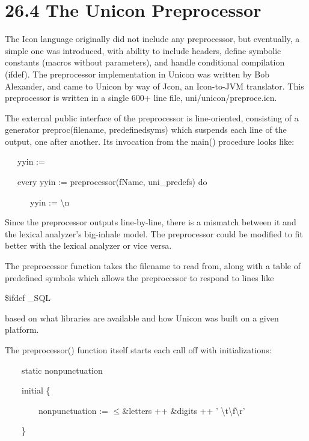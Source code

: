 \section[26.4 The Unicon Preprocessor]{26.4 The Unicon Preprocessor}

The Icon language originally did not include any preprocessor, but
eventually, a simple one was introduced, with ability to include
headers, define symbolic constants (macros without parameters), and
handle conditional compilation (ifdef).  The preprocessor
implementation in Unicon was written by Bob Alexander, and came to
Unicon by way of Jcon, an Icon-to-JVM translator. This preprocessor is
written in a single 600+ line file, uni/unicon/preproce.icn.

The external public interface of the preprocessor is line-oriented,
consisting of a generator preproc(filename, predefinedsyms) which
suspends each line of the output, one after another. Its invocation
from the main() procedure looks like:

{\ttfamily\mdseries
\ \ \ yyin := {\textquotedbl}{\textquotedbl}}

{\ttfamily\mdseries
\ \ \ every yyin {\textbar}{\textbar}:= preprocessor(fName, uni\_predefs) do}

{\ttfamily\mdseries
\ \ \ \ \ \ yyin {\textbar}{\textbar}:= {\textquotedbl}{\textbackslash}n{\textquotedbl}}


Since the preprocessor outputs line-by-line, there is a mismatch
between it and the lexical analyzer's big-inhale model.  The
preprocessor could be modified to fit better with the lexical analyzer
or vice versa.

The preprocessor function takes the filename to read from, along with
a table of predefined symbols which allows the preprocessor to respond
to lines like

{\ttfamily\mdseries
\$ifdef \_SQL}

\noindent based on what libraries are available and how Unicon was
built on a given platform.

The preprocessor() function itself starts each call off with initializations: 

{\ttfamily\mdseries
\ \ \ \ static nonpunctuation}

{\ttfamily\mdseries
\ \ \ \ initial \{}

{\ttfamily\mdseries
\ \ \ \ \ \ \ \ nonpunctuation := ${\leq}$\&letters ++ \&digits ++ '
{\textbackslash}t{\textbackslash}f{\textbackslash}r'}

{\ttfamily\mdseries
\ \ \ \ \}}



